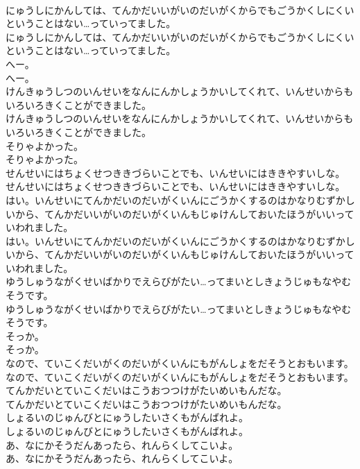 \documentclass[8pt]{extreport}
\begin{document}
\begin{CJK}{UTF8}{min}
\\	にゅうしにかんしては、てんかだいいがいのだいがくからでもごうかくしにくいということはない…っていってました。
\\	にゅうしにかんしては、てんかだいいがいのだいがくからでもごうかくしにくいということはない…っていってました。
\\	へー。
\\	へー。
\\	けんきゅうしつのいんせいをなんにんかしょうかいしてくれて、いんせいからもいろいろきくことができました。
\\	けんきゅうしつのいんせいをなんにんかしょうかいしてくれて、いんせいからもいろいろきくことができました。
\\	そりゃよかった。
\\	そりゃよかった。
\\	せんせいにはちょくせつききづらいことでも、いんせいにはききやすいしな。
\\	せんせいにはちょくせつききづらいことでも、いんせいにはききやすいしな。
\\	はい。いんせいにてんかだいのだいがくいんにごうかくするのはかなりむずかしいから、てんかだいいがいのだいがくいんもじゅけんしておいたほうがいいっていわれました。
\\	はい。いんせいにてんかだいのだいがくいんにごうかくするのはかなりむずかしいから、てんかだいいがいのだいがくいんもじゅけんしておいたほうがいいっていわれました。
\\	ゆうしゅうながくせいばかりでえらびがたい…ってまいとしきょうじゅもなやむそうです。
\\	ゆうしゅうながくせいばかりでえらびがたい…ってまいとしきょうじゅもなやむそうです。
\\	そっか。
\\	そっか。
\\	なので、ていこくだいがくのだいがくいんにもがんしょをだそうとおもいます。
\\	なので、ていこくだいがくのだいがくいんにもがんしょをだそうとおもいます。
\\	てんかだいとていこくだいはこうおつつけがたいめいもんだな。
\\	てんかだいとていこくだいはこうおつつけがたいめいもんだな。
\\	しょるいのじゅんびとにゅうしたいさくもがんばれよ。
\\	しょるいのじゅんびとにゅうしたいさくもがんばれよ。
\\	あ、なにかそうだんあったら、れんらくしてこいよ。
\\	あ、なにかそうだんあったら、れんらくしてこいよ。

\end{CJK}
\end{document}
